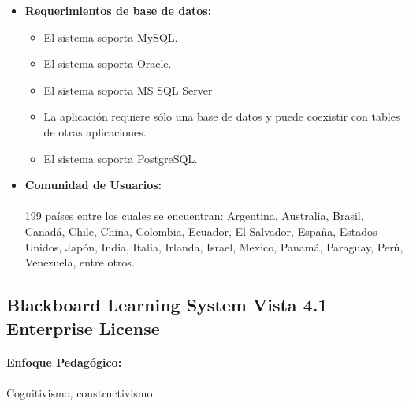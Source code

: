 	\begin{itemize}
		\item \textbf{Requerimientos de base de datos:}
			\begin{itemize}
				\item El sistema soporta MySQL.
				\item El sistema soporta Oracle.
				\item El sistema soporta MS SQL Server
				\item La aplicación requiere sólo una base de datos y puede coexistir con tables de otras aplicaciones.
				\item El sistema soporta PostgreSQL.
			\end{itemize}
	\end{itemize}
	\begin{itemize}
		\item \textbf{Comunidad de Usuarios:} \\
		\citep{MOD_COM2008}\\
		199 países entre los cuales se encuentran: Argentina, Australia, Brasil, Canadá, Chile, China, Colombia, Ecuador, El Salvador, España, Estados Unidos, Japón, India, Italia, Irlanda, Israel, Mexico, Panamá, Paraguay, Perú, Venezuela, entre otros.
	\end{itemize}

\subsection[Blackboard LS 4.1]{Blackboard Learning System Vista 4.1 Enterprise License}
	\paragraph{Enfoque Pedagógico:} Cognitivismo, constructivismo.

